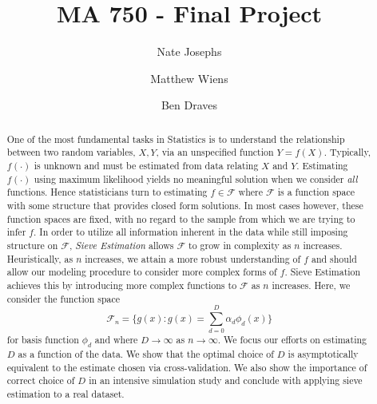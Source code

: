 \documentclass[12pt]{article}  %
\title{MA 750 - Final Project}
\author{
  Nate Josephs\\
  \and
  Matthew Wiens 
  \and 
  Ben Draves
}
\begin{document}
\maketitle 
\begin{abstract} One of the most fundamental tasks in Statistics is to understand the relationship between two random variables, $X,Y$, via an unspecified function $Y = f(X)$. Typically, $f(\cdot)$ is unknown and must be estimated from data relating $X$ and $Y$. Estimating $f(\cdot)$ using maximum likelihood yields no meaningful solution when we consider \textit{all} functions. Hence statisticians turn to estimating $f\in\mathcal{F}$ where $\mathcal{F}$ is a function space with some structure that provides closed form solutions. In most cases however, these function spaces are fixed, with no regard to the sample from which we are trying to infer $f$. In order to utilize all information inherent in the data while still imposing structure on $\mathcal{F}$, \textit{Sieve Estimation} allows $\mathcal{F}$ to grow in complexity as $n$ increases. Heuristically, as $n$ increases, we attain a more robust understanding of $f$ and should allow our modeling procedure to consider more complex forms of $f$. Sieve Estimation achieves this by introducing more complex functions to $\mathcal{F}$ as $n$ increases. Here, we consider the function space $$\mathcal{F}_n = \Big\{g(x): g(x) = \sum_{d=0}^{D}\alpha_d\phi_d(x)\Big\}$$ for basis function $\phi_d$ and where $D\to\infty$ as $n\to\infty$. We focus our efforts on estimating $D$ as a function of the data. We show that the optimal choice of $D$ is asymptotically equivalent to the estimate chosen via cross-validation. We also show the importance of correct choice of $D$ in an intensive simulation study and conclude with applying sieve estimation to a real dataset. 
\end{abstract}
\end{document}
